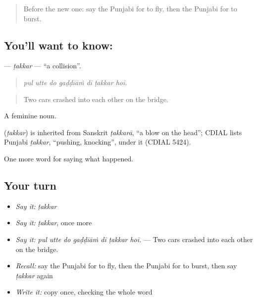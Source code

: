 \label{lesson:PA-C318-takkar}



\begin{quote}
Before the new one: say the Punjabi for to fly, then the Punjabi for to burst.
\end{quote}

\subsection*{You'll want to know: }
\textbf{} — \emph{ṭakkar} — \textquotedblleft{}a collision\textquotedblright{}.

\begin{quote}
      
\end{quote}

\begin{quote}
\emph{pul utte do gaḍḍīāṁ dī ṭakkar hoī.}
\end{quote}

\begin{quote}
Two cars crashed into each other on the bridge.
\end{quote}

A feminine noun.

\begin{cousinweb}
\textbf{} (\emph{ṭakkar}) is inherited from Sanskrit \emph{ṭakkarā}, \textquotedblleft{}a blow on the head\textquotedblright{}; CDIAL lists Punjabi \emph{ṭakkar}, \textquotedblleft{}pushing, knocking\textquotedblright{}, under it (CDIAL 5424).
\end{cousinweb}

\begin{grammarlens}[title={What you've built}]
One more word for saying what happened.
\end{grammarlens}

\subsection*{Your turn}
\begin{itemize}
\raggedright
  \item \emph{Say it:} \emph{ṭakkar}
  \item \emph{Say it:} \emph{ṭakkar}, once more
  \item \emph{Say it:} \emph{pul utte do gaḍḍīāṁ dī ṭakkar hoī.} — Two cars crashed into each other on the bridge.
  \item \emph{Recall:} say the Punjabi for to fly, then the Punjabi for to burst, then say \emph{ṭakkar} again
  \item \emph{Write it:} copy \textbf{} once, checking the whole word
\end{itemize}

